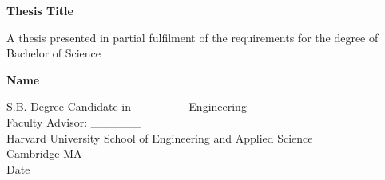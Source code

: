\begin{titlepage}
    \begin{center}
        \vspace*{1cm}
        \Huge
        \textbf{Thesis Title}

 
        \vspace{1.5cm}
 
        A thesis presented in partial fulfilment of the requirements for the degree of Bachelor of Science
 
        \vfill
 
        
        \textbf{Name}
 
        \vspace{0.8cm}
 

 
        \Large
        S.B. Degree Candidate in \_\_\_\_\_\_ Engineering\\
        Faculty Advisor: \_\_\_\_\_\_\\
        Harvard University School of Engineering and Applied Science\\
        Cambridge MA\\
        Date
 
    \end{center}
\end{titlepage}